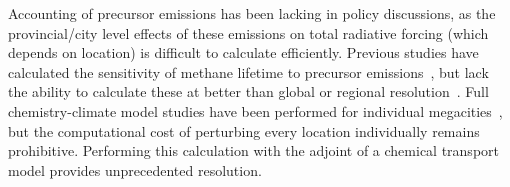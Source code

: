 Accounting of precursor emissions has been lacking in policy discussions, as the provincial/city level effects of these emissions on total radiative forcing (which depends on location) is difficult to calculate efficiently. Previous studies have calculated the sensitivity of methane lifetime to precursor emissions~\citep{ref:prather2001,ref:fry2012,ref:holmes2013}, but lack the ability to calculate these at better than global or regional resolution~\citep{ref:naik2005,ref:macintosh2015}. Full chemistry-climate model studies have been performed for individual megacities~\citep{ref:dang2015}, but the computational cost of perturbing every location individually remains prohibitive. Performing this calculation with the adjoint of a chemical transport model provides unprecedented resolution.

